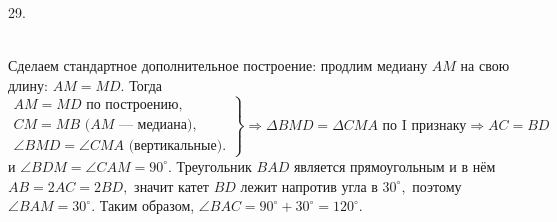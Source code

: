 29. \begin{figure}[ht!]
\end{figure}\\
Сделаем стандартное дополнительное построение: продлим медиану $AM$ на свою длину: $AM=MD.$ Тогда $\left.\begin{array}{l}AM=MD\text{ по построению},\\
 CM=MB\text{ ($AM$ --- медиана)},\\ \angle BMD=\angle CMA\text{ (вертикальные).}\end{array}\right\}\Rightarrow
\Delta BMD=\Delta CMA\text{ по I признаку}\Rightarrow AC=BD$ и $\angle BDM=\angle CAM=90^\circ.$ Треугольник $BAD$ является прямоугольным и в нём $AB=2AC=2BD,$ значит катет $BD$ лежит напротив угла в $30^\circ,$ поэтому $\angle BAM=30^\circ.$ Таким образом, $\angle BAC=90^\circ+30^\circ=120^\circ.$\\
